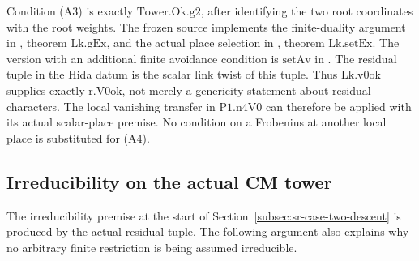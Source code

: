 Condition (A3) is exactly \(\mathrm{Tower.Ok.g2}\), after
identifying the two root coordinates with the root weights.
The frozen source implements the finite-duality argument
in ,
theorem \(\mathrm{Lk.gEx}\), and the actual place selection
in , theorem \(\mathrm{Lk.setEx}\).
The version with an additional finite avoidance condition
is \(\mathrm{setAv}\) in
.
The residual tuple in the Hida datum is the scalar link
twist of this tuple.
Thus \(\mathrm{Lk.v0ok}\) supplies exactly
\(\mathrm{r.V0ok}\), not merely a genericity statement
about residual characters.
The local vanishing transfer in
\(\mathrm{P1.n4V0}\) can therefore be applied with its
actual scalar-place premise.
No condition on a Frobenius at another local place
is substituted for (A4).


\subsection{Irreducibility on the actual CM tower}
\label{subsec:sr-actual-tower-irreducibility}
The irreducibility premise at the start of
Section~\ref{subsec:sr-case-two-descent} is produced by
the actual residual tuple.
The following argument also explains why no arbitrary
finite restriction is being assumed irreducible.

